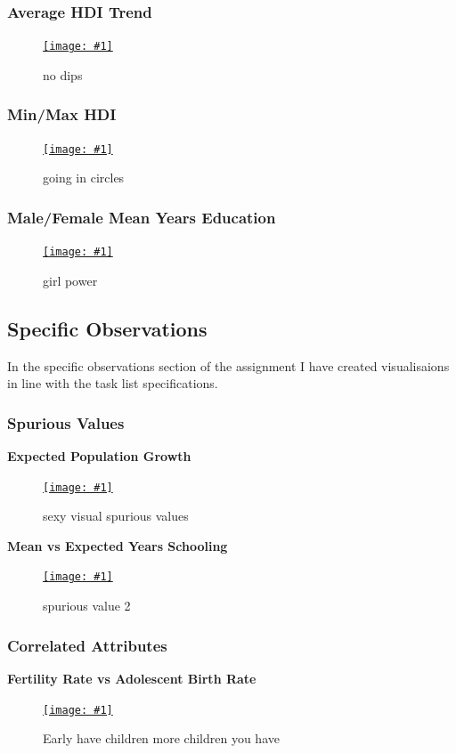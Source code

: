 \documentclass[11pt,a4paper,final]{article}
\newcommand\onlinefig[3]{
\begin{figure}[H]
  \centering
  \href{#3}{\texttt{[image: \#1]}}
  \caption{#2} 
  \label{fig:#1}
\end{figure}
}
\begin{document}
\begin{multicols}{2}
\subsubsection{Average HDI Trend}
\onlinefig{global_average_hdi_areachart}{no dips}{https://public.tableau.com/views/CS3205_hdi_csv/Sheet2?:language=en-GB&:display_count=n&:origin=viz_share_link}

\subsubsection{Min/Max HDI}
\onlinefig{min_vs_max_hdi_radialplot}{going in circles}{https://user-images.githubusercontent.com/56483187/155840052-f17e03e9-c48b-4dfd-8096-2bd5f066dd91.png}

\subsubsection{Male/Female Mean Years Education}
\onlinefig{men_vs_women_mean_years_education_barchart}{girl power}{https://public.tableau.com/views/CS3205-HDI/Sheet2?:language=en-GB&:display_count=n&:origin=viz_share_link}


\subsection{Specific Observations}
In the specific observations section of the assignment I have created visualisaions in line with the task list specifications.

\subsubsection{Spurious Values}
\textbf{Expected Population Growth}
\onlinefig{population_growth_ratio_boxplot}{sexy visual spurious values}{https://public.tableau.com/views/CS3205-HDI/Sheet11?:language=en-GB&:display_count=n&:origin=viz_share_link}

\begin{flushleft}
\textbf{Mean vs Expected Years Schooling}
\end{flushleft}
\vspace{-2cm}
\onlinefig{mean_vs_expected_years_schooling_scatterplot.png}{spurious value 2}{https://public.tableau.com/views/CS3205-HDI/Sheet7?:language=en-GB&:display_count=n&:origin=viz_share_link}

\subsubsection{Correlated Attributes}
\begin{flushleft}
\textbf{Fertility Rate vs Adolescent Birth Rate}
\end{flushleft}
\onlinefig{fertility_vs_adolescent_birth_rate_scatterplot}{Early have children more children you have}{https://public.tableau.com/views/CS3205-HDI/Sheet10?:language=en-GB&:display_count=n&:origin=viz_share_link}


\end{multicols}
\end{document}
